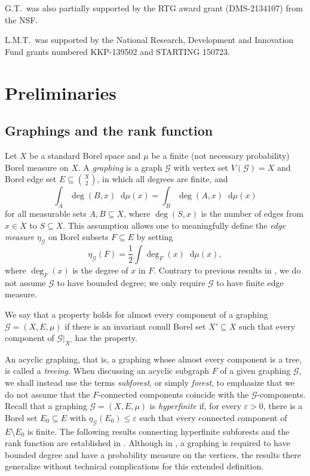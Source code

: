 \documentclass{article}
\theoremstyle{plain}
\theoremstyle{definition}
\newcommand*\diff{\mathop{}\!\mathrm{d}}
\newcommand{\cG}{\mathcal{G}}
\newcommand{\eps}{\varepsilon}
\begin{document}
G.T.\ was also partially supported by the RTG award grant (DMS-2134107) from the NSF.

L.M.T.\ was supported by the National Research, Development and Innovation Fund grants numbered KKP-139502 and STARTING 150723.


\section{Preliminaries}\label{sec:prelim}
\subsection{Graphings and the rank function} \label{subsec:graphings}


Let $X$ be a standard Borel space and $\mu$ be a finite (not necessary probability) Borel measure on $X$. A \emph{graphing} is a graph $\cG$ with vertex set $V(\cG) = X$ and Borel edge set $E \subseteq \binom{X}{2}$, in which all degrees are finite, and 
\begin{equation*} \label{eqn:graphing}
\int_{A} \deg(B,x) \diff \mu (x) = \int_{B} \deg(A,x) \diff \mu (x)
\end{equation*}
for all measurable sets $A,B \subseteq X$, where $\deg(S,x)$ is the number of edges from $x \in X$ to $S \subseteq X$. This assumption allows one to meaningfully define the \emph{edge measure} $\eta_\cG $ on Borel subsets $F\subseteq E$ by setting
\begin{equation*}
\eta_\cG(F)=\frac{1}{2}\int \deg_F(x)\diff \mu (x),
\end{equation*}
where $\deg_F(x)$ is the degree of $x$ in $F$. Contrary to previous results in \cite{lovasz2024matroid,berczi2026cycle}, we do not assume $\cG$ to have bounded degree; we only require $\cG $ to have finite edge measure.

We say that a property holds for almost every component of a graphing \(\mathcal G=(X,E,\mu)\) if there is an invariant conull Borel set \(X'\subseteq X\) such that every component of \(\mathcal G|_{X'}\) has the property.

An acyclic graphing, that is, a graphing whose almost every component is a tree, is called a \emph{treeing}. When discussing an acyclic subgraph $F$ of a given graphing $\cG$, we shall instead use the terms \emph{subforest}, or simply \emph{forest}, to emphasize that we do not assume that the $F$-connected components coincide with the $\cG$-components.
Recall that a graphing $\cG=(X,E, \mu)$ is \emph{hyperfinite} if, for every $\eps > 0$, there is a Borel set $E_0 \subseteq E$ with $\eta_\cG(E_0) \leq \eps$ such that every connected component of $E\setminus E_0$ is finite. The following results connecting hyperfinite subforests and the rank function are established in \cite{berczi2026cycle}. Although in \cite{berczi2026cycle}, a graphing is required to have bounded degree and have a probability measure on the vertices, the results there generalize without technical complications for this extended definition. 
\end{document}
